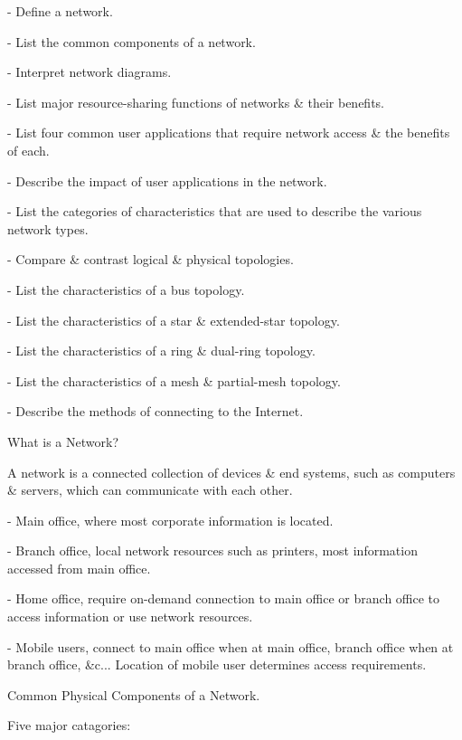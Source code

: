 \item - Define a network.
\lskip
\item - List the common components of a network.
\item - Interpret network diagrams.
\item - List major resource-sharing functions of networks \& their benefits.
\item - List four common user applications that require network access \& the benefits of each.
\item - Describe the impact of user applications in the network.
\item - List the categories of characteristics that are used to describe the various network types.
\item - Compare \& contrast logical \& physical topologies.
\item - List the characteristics of a bus topology.
\item - List the characteristics of a star \& extended-star topology.
\item - List the characteristics of a ring \& dual-ring topology.
\item - List the characteristics of a mesh \& partial-mesh topology.
\item - Describe the methods of connecting to the Internet.
\pskip

What is a Network?

A network is a connected collection of devices \& end systems, such as computers \& servers, which can communicate with each other.

\item - Main office, where most corporate information is located.
\lskip
\item - Branch office, local network resources such as printers, most information accessed from main office.
\item - Home office, require on-demand connection to main office or branch office to access information or use network resources.
\item - Mobile users, connect to main office when at main office, branch office when at branch office, \&c... Location of mobile user determines access requirements.
\pskip

Common Physical Components of a Network.

Five major catagories:

